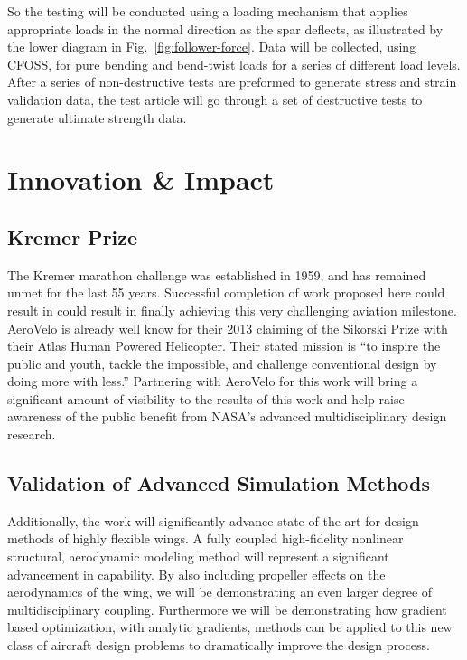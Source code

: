 \documentclass[]{aiaa-tc}
\begin{document}
        So the testing will be conducted using a loading mechanism that applies appropriate loads in the normal direction
        as the spar deflects, as illustrated by the lower diagram in Fig.~\ref{fig:follower-force}. Data will be collected, using CFOSS, for pure bending and bend-twist loads for a series of different 
        load levels. After a series of non-destructive tests are preformed to generate stress and strain validation data, the test 
        article will go through a set of destructive tests to generate ultimate strength data. 


  \section{Innovation \& Impact}

    \subsection{Kremer Prize}
    The Kremer marathon challenge was established in 1959, and has remained unmet for the last 55 years. 
    Successful completion of work proposed here could result in could result in finally achieving this very challenging
    aviation milestone. AeroVelo is already well know for their 2013 claiming of the Sikorski Prize with their Atlas 
    Human Powered Helicopter. Their stated mission is ``to inspire the public and youth, tackle the impossible, and 
    challenge conventional design by doing more with less.'' Partnering with AeroVelo for this work will bring a significant
    amount of visibility to the results of this work and help raise awareness of the public benefit from NASA's advanced 
    multidisciplinary design research. 

    \subsection{Validation of Advanced Simulation Methods}
    Additionally, the work will significantly advance state-of-the art for design methods of highly flexible wings. 
    A fully coupled high-fidelity nonlinear structural, aerodynamic modeling method will represent a significant advancement 
    in capability. By also including propeller effects on the aerodynamics of the wing, we will be demonstrating an even larger 
    degree of multidisciplinary coupling. Furthermore we will be demonstrating 
    how gradient based optimization, with analytic gradients, methods can be applied to this new class of aircraft design problems 
    to dramatically improve the design process.
\end{document}

